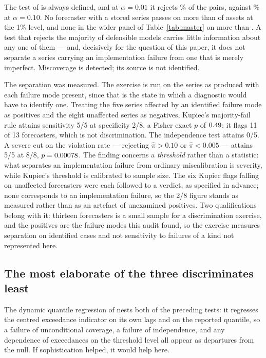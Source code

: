 \documentclass[preprint,11pt,authoryear]{elsarticle}
\newcommand{\1}{\boldsymbol{1}}
\begin{document}
The test of \citet{kupiec1995} is always defined, and at $\alpha = 0.01$ it
rejects \nSeqKupiecRejRawOne\% of the \nSeqPairs{} pairs, against
\nSeqKupiecRejRawTen\% at $\alpha = 0.10$. No forecaster with a stored series
passes on more than \nSeqBestKupiec{} of \nMainAssets{} assets at the 1\% level,
and none in the wider panel of Table~\ref{tab:master} on more than
\nMainBestKupiec. A test
that rejects the majority of defensible models carries little information about
any one of them --- and, decisively for the question of this paper, it does not
separate a series carrying an implementation failure from one that is merely
imperfect. Miscoverage is detected; its source is not identified.

The separation was measured. The exercise is run on the
series as produced with each failure mode present, since that is the state in
which a diagnostic would have to identify one. Treating the five series affected
by an identified failure mode as positives and the eight unaffected series as
negatives, Kupiec's majority-fail rule attains sensitivity 5/5 at
specificity 2/8, a Fisher exact $p$ of $0.49$: it flags 11 of 13 forecasters,
which is not discrimination. The independence test attains 0/5. A severe cut on
the violation rate --- rejecting $\hat\pi > 0.10$ or $\hat\pi < 0.005$ ---
attains 5/5 at 8/8, $p = 0.00078$. The finding concerns a \emph{threshold} rather
than a statistic: what separates an implementation failure from ordinary
miscalibration is severity, while Kupiec's threshold is calibrated to sample
size. The six Kupiec flags falling on unaffected forecasters were each followed
to a verdict, as specified in advance; none corresponds to an implementation
failure, so the 2/8 figure stands as measured rather than as an artefact of
unexamined positives. Two qualifications belong with it: thirteen forecasters is
a small sample for a discrimination exercise, and the positives are the failure
modes this audit found, so the exercise measures separation on identified cases
and not sensitivity to failures of a kind not represented here.

\subsection{The most elaborate of the three discriminates least}
\label{sec:blindspot_dq}

The dynamic quantile regression of \citet{engle2004caviar} nests both of the
preceding tests: it regresses the centred exceedance indicator on its own lags
and on the reported quantile, so a failure of unconditional coverage, a failure
of independence, and any dependence of exceedances on the threshold level all
appear as departures from the null. If sophistication helped, it would help here.
\end{document}
